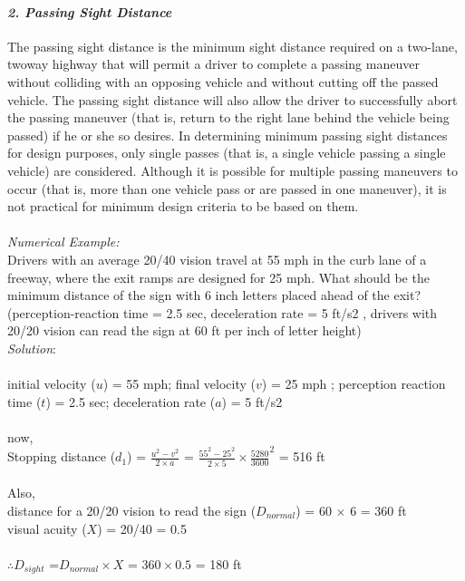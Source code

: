 \paragraph{\emph{2. Passing Sight Distance}}
The passing sight distance is the minimum sight distance required on a two-lane, twoway highway that will permit a driver to complete a passing maneuver without colliding with an opposing vehicle and without cutting off the passed vehicle. The passing sight distance will also allow the driver to successfully abort the passing maneuver (that is, return to the right lane behind the vehicle being passed) if he or she so desires. In determining minimum passing sight distances for design purposes, only single passes (that is, a single vehicle passing a single vehicle) are considered. Although it is possible for multiple passing maneuvers to occur (that is, more than one vehicle pass or are passed in one maneuver), it is not practical for minimum design criteria to be based on them.\\\\
\emph{Numerical Example:}\\
Drivers with an average 20/40 vision travel at 55 mph in the curb lane of a freeway, where the exit ramps are designed for 25 mph. What should be the minimum distance of the sign with 6 inch letters placed ahead of the exit? (perception-reaction time = 2.5 sec, deceleration rate = 5 ft/s2 , drivers with 20/20 vision can read the sign at 60 ft per inch of letter height)\\
\emph{Solution}:\\\\
initial velocity ($ u $) = 55 mph; final velocity ($ v $) = 25 mph ; perception reaction time ($ t $) = 2.5 sec; 	deceleration rate ($ a $) = 5 ft/s2 \\\\
now,\\
Stopping distance ($ d_1 $) = $ \frac{u^2 - v^2}{2 \times a} $ = $ \frac{55^2 - 25^2}{2 \times 5} \times \frac{5280}{3600}^2 $ = 516 ft\\\\
Also,\\
distance for a 20/20 vision to read the sign ($ D_{normal} $) = 60 $ \times $ 6 = 360 ft\\
visual acuity ($ X $) = 20/40 = 0.5\\\\
$ \therefore D_{sight} $ =$ D_{normal} \times X $ = $ 360 \times 0.5 $ = 180 ft\\\\
